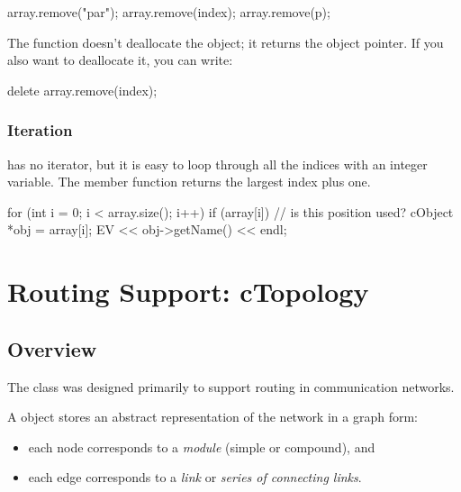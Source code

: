 \begin{cpp}
array.remove("par");
array.remove(index);
array.remove(p);
\end{cpp}

The  function doesn't deallocate the object; it
returns the object pointer. If you also want to deallocate it, you can
write:

\begin{cpp}
delete array.remove(index);
\end{cpp}

\subsubsection{Iteration}
\label{sec:sim-lib:carray-iteration}

 has no iterator, but it is easy to loop through all the
indices with an integer variable. The  member function
returns the largest index plus one.

\begin{cpp}
for (int i = 0; i < array.size(); i++) {
  if (array[i]) { // is this position used?
    cObject *obj = array[i];
    EV << obj->getName() << endl;
  }
}
\end{cpp}




\section{Routing Support: cTopology}
\label{sec:sim-lib:ctopology}

\subsection{Overview}
\label{sec:sim-lib:ctopology-overview}

The  class was designed primarily to support
routing in communication networks.

A  object stores an abstract representation of the
network in a graph form:
\begin{itemize}
  \item each  node corresponds to a \textit{module}
    (simple or compound), and
  \item each  edge corresponds to a \textit{link} or
    \textit{series of connecting links}.
\end{itemize}

